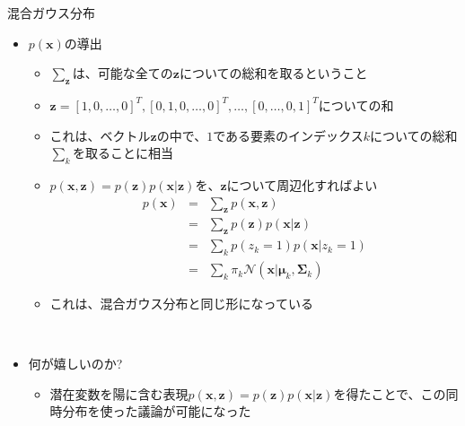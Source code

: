\documentclass[dvipdfmx,notheorems,t]{beamer}
\begin{document}
\begin{frame}{混合ガウス分布}
\begin{itemize}
	\item $p(\bm{x})$の導出
	\begin{itemize}
		\item $\displaystyle \sum_{\bm{z}}$は、可能な全ての$\bm{z}$についての総和を取るということ
		\item $\bm{z} = \left[ 1, 0, \ldots, 0 \right]^T, \left[ 0, 1, 0, \ldots, 0 \right]^T, \ldots, \left[ 0, \ldots, 0, 1 \right]^T$についての和
		\item これは、ベクトル$\bm{z}$の中で、$1$である要素のインデックス$k$についての総和$\displaystyle \sum_k$を取ることに相当
		\newline
		\item $p(\bm{x}, \bm{z}) = p(\bm{z}) p(\bm{x} | \bm{z})$を、$\bm{z}$について周辺化すればよい
		\begin{eqnarray}
			p(\bm{x}) &=& \sum_{\bm{z}} p(\bm{x}, \bm{z}) \\
			&=& \sum_{\bm{z}} p(\bm{z}) p(\bm{x} | \bm{z}) \\
			&=& \sum_k p(z_k = 1) p(\bm{x} | z_k = 1) \\
			&=& \sum_k \pi_k \mathcal{N}(\bm{x} | \bm{\mu}_k, \bm{\Sigma}_k)
		\end{eqnarray}
		\item これは、混合ガウス分布と同じ形になっている
	\end{itemize} \
	
	\item 何が嬉しいのか?
	\begin{itemize}
		\item 潜在変数を陽に含む表現$p(\bm{x}, \bm{z}) = p(\bm{z}) p(\bm{x} | \bm{z})$を得たことで、この同時分布を使った議論が可能になった
	\end{itemize}
\end{itemize}

\end{frame}
\end{document}
